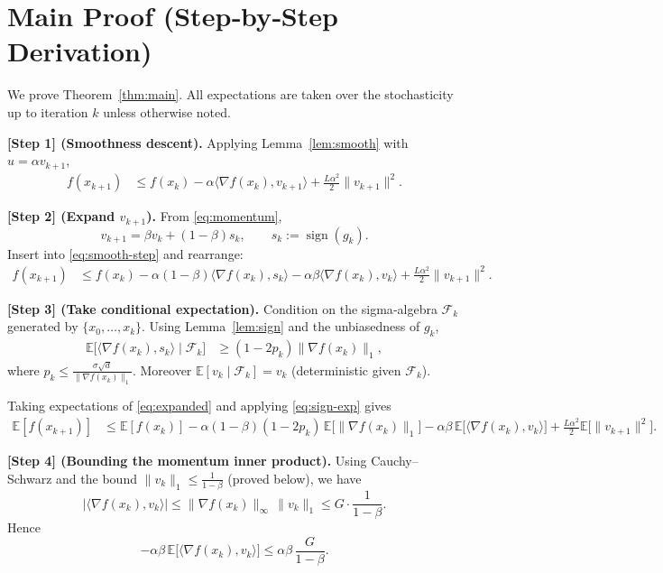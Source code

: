 \documentclass[11pt]{article}
\begin{document}
\section*{Main Proof (Step‑by‑Step Derivation)}
We prove Theorem~\ref{thm:main}. All expectations are taken over the stochasticity up to iteration $k$ unless otherwise noted.

\bigskip
\noindent\textbf{[Step 1] (Smoothness descent).}  
Applying Lemma~\ref{lem:smooth} with $u=\alpha v_{k+1}$,
\begin{align}
f(x_{k+1}) &\le f(x_k)-\alpha\langle\nabla f(x_k),v_{k+1}\rangle
            +\frac{L\alpha^{2}}{2}\|v_{k+1}\|^{2}. \label{eq:smooth-step}
\end{align}

\bigskip
\noindent\textbf{[Step 2] (Expand $v_{k+1}$).}  
From \eqref{eq:momentum},
\[
v_{k+1}= \beta v_{k}+(1-\beta)s_{k},\qquad 
s_{k}:=\operatorname{sign}(g_k).
\]
Insert into \eqref{eq:smooth-step} and rearrange:
\begin{align}
f(x_{k+1}) &\le f(x_k)-\alpha (1-\beta)\langle\nabla f(x_k),s_{k}\rangle
            -\alpha\beta\langle\nabla f(x_k),v_{k}\rangle
            +\frac{L\alpha^{2}}{2}\|v_{k+1}\|^{2}. \label{eq:expanded}
\end{align}

\bigskip
\noindent\textbf{[Step 3] (Take conditional expectation).}  
Condition on the sigma‑algebra $\mathcal{F}_k$ generated by $\{x_0,\dots,x_k\}$.
Using Lemma~\ref{lem:sign} and the unbiasedness of $g_k$,
\begin{align}
\mathbb{E}\!\big[\langle\nabla f(x_k),s_{k}\rangle\mid\mathcal{F}_k\big]
&\ge (1-2p_k)\|\nabla f(x_k)\|_1, \label{eq:sign-exp}
\end{align}
where $p_k\le \frac{\sigma\sqrt{d}}{\|\nabla f(x_k)\|_1}$.
Moreover $\mathbb{E}[v_k\mid\mathcal{F}_k]=v_k$ (deterministic given $\mathcal{F}_k$).

Taking expectations of \eqref{eq:expanded} and applying \eqref{eq:sign-exp} gives
\begin{align}
\mathbb{E}[f(x_{k+1})] 
&\le \mathbb{E}[f(x_k)]
   -\alpha(1-\beta)(1-2p_k)\,\mathbb{E}\!\big[\|\nabla f(x_k)\|_1\big]
   -\alpha\beta\,\mathbb{E}\!\big[\langle\nabla f(x_k),v_{k}\rangle\big]
   +\frac{L\alpha^{2}}{2}\mathbb{E}\!\big[\|v_{k+1}\|^{2}\big]. \label{eq:exp-descent}
\end{align}

\bigskip
\noindent\textbf{[Step 4] (Bounding the momentum inner product).}  
Using Cauchy–Schwarz and the bound $\|v_k\|_1\le \frac{1}{1-\beta}$ (proved below), we have
\[
|\langle\nabla f(x_k),v_{k}\rangle|
\le \|\nabla f(x_k)\|_{\infty}\,\|v_{k}\|_{1}
\le G\cdot\frac{1}{1-\beta}.
\]
Hence
\[
-\alpha\beta\,\mathbb{E}\!\big[\langle\nabla f(x_k),v_{k}\rangle\big]
\le \alpha\beta\,\frac{G}{1-\beta}. \label{eq:momentum-bound}
\]
\end{document}
